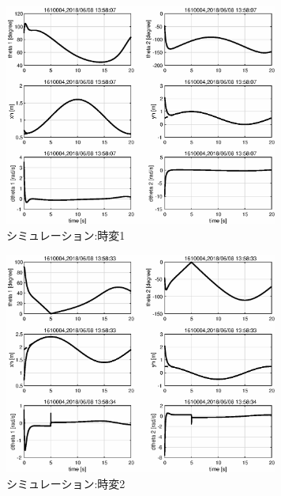 \documentclass[a4paper,11pt,titlepage]{jsarticle}
\begin{document}
{\begin{figure}[H]
  \begin{center}
    \includegraphics[width = 9cm]{画像/eps_手先_時変1_時間応答}
    \caption{シミュレーション:時変1}
    \label{手先2}
  \end{center}
\end{figure}

\begin{figure}[H]
  \begin{center}
    \includegraphics[width = 9cm]{画像/eps_手先_時変2_時間応答}
    \caption{シミュレーション:時変2}
    \label{手先3}
  \end{center}
\end{figure}

}
\end{document}
